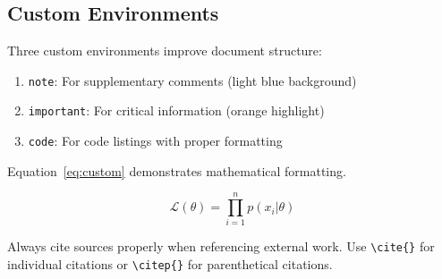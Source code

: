\subsection{Custom Environments}

Three custom environments improve document structure:

\begin{enumerate}
    \item \texttt{note}: For supplementary comments (light blue background)
    \item \texttt{important}: For critical information (orange highlight)
    \item \texttt{code}: For code listings with proper formatting
\end{enumerate}

Equation~\ref{eq:custom} demonstrates mathematical formatting.

\begin{equation}\label{eq:custom}
\mathcal{L}(\theta) = \prod_{i=1}^{n} p(x_i | \theta)
\end{equation}

\begin{important}
Always cite sources properly when referencing external work. Use \verb|\cite{}| for individual citations or \verb|\citep{}| for parenthetical citations.
\end{important}